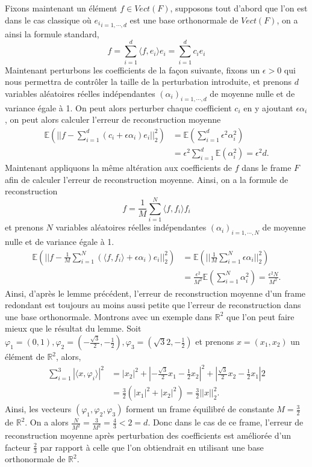 Fixons maintenant un élément $f\in  Vect(F)$,
supposons tout d'abord que l'on est dans le cas classique où ${e_i}_{i=1, \cdots, d}$ est une base orthonormale de $Vect(F)$, on a ainsi la formule standard,
\begin{equation*}
	f = \sum_{i=1}^d \langle f, e_i \rangle e_i = \sum_{i=1}^d c_i e_i
\end{equation*}
Maintenant perturbons les coefficients de la façon suivante, fixons un $\epsilon >0$ qui nous permettra de contrôler la taille de la perturbation introduite, et prenons $d$ variables aléatoires réelles indépendantes $(\alpha_i)_{i=1,\cdots, d}$ de moyenne nulle et de variance égale à 1.
On peut alors perturber chaque coefficient $c_i$ en y ajoutant $\epsilon \alpha_i$, on peut alors calculer l'erreur de reconstruction moyenne
\begin{align*}
	\mathbb{E}\left(|| f- \sum_{i=1}^d (c_i + \epsilon \alpha_i)e_i||_2^2\right) &= \mathbb{E}\left(\sum_{i=1}^d \epsilon^2 \alpha_i^2\right)\\
		&= \epsilon^2 \sum_{i=1}^d \mathbb{E} (\alpha_i^2) = \epsilon^2 d.
\end{align*} 
Maintenant appliquons la même altération aux coefficients de $f$ dans le frame $F$ afin de calculer l'erreur de reconstruction moyenne.
Ainsi, on a la formule de reconstruction
\begin{equation*}
	f = \frac{1}{M}\sum_{i=1}^N \langle f, f_i \rangle f_i
\end{equation*}
et prenons $N$ variables aléatoires réelles indépendantes $(\alpha_i)_{i=1, \cdots, N}$  de moyenne nulle et de variance égale à 1.
\begin{align*}
	\mathbb{E}\left(|| f- \frac{1}{M}\sum_{i=1}^N (\langle f, f_i\rangle + \epsilon \alpha_i)e_i||_2^2\right) &= \mathbb{E}\left(||\frac{1}{M} \sum_{i=1}^N \epsilon \alpha_i||_2^2\right)\\
	&= \frac{\epsilon^2}{M^2} \mathbb{E}(\sum_{i=1}^N \alpha_i^2) = \frac{\epsilon^2 N}{M^2}.	
\end{align*}
Ainsi, d'après le lemme précédent, l'erreur de reconstruction moyenne d'un frame redondant est toujours au moins aussi petite que l'erreur de reconstruction dans une base orthonormale.
Montrons avec un exemple dans $\mathbb{R}^2$ que l'on peut faire mieux que le résultat du lemme.
Soit $\varphi_1 = (0, 1), \varphi_2 = (-\frac{\sqrt{3}}{2}, -\frac{1}{2}), \varphi_3 =(\sqrt{3}{2}, -\frac{1}{2})$ et prenons $x=(x_1, x_2)$ un élément de $\mathbb{R}^2$, alors,
\begin{align*}
	\sum_{i=1}^3 |\langle x, \varphi_i \rangle|^2 &= |x_2|^2 + |-\frac{\sqrt{3}}{2}x_1 -\frac{1}{2} x_2|^2 + |\frac{\sqrt{3}}{2}x_2 - \frac{1}{2}x_1|2 \\
	&= \frac{3}{2}(|x_1|^2 + |x_2|^2) = \frac{3}{2} ||x||_2^2.
\end{align*}
Ainsi, les vecteurs $(\varphi_1, \varphi_2, \varphi_3)$ forment un frame équilibré de constante $M=\frac{3}{2}$ de $\mathbb{R}^2$.
On a alors $\frac{N}{M^2} = \frac{3}{M^2} = \frac{4}{3} < 2 = d$.
Donc dans le cas de ce frame, l'erreur de reconstruction moyenne après perturbation des coefficients est améliorée d'un facteur $\frac{2}{3}$ par rapport à celle que l'on obtiendrait en utilisant une base orthonormale de $\mathbb{R}^2$.

